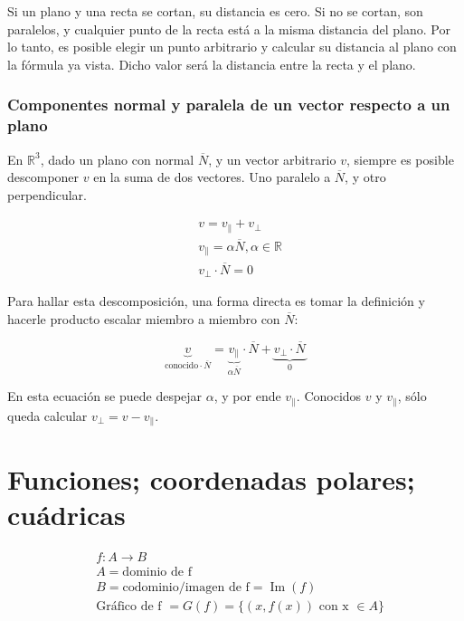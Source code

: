 \documentclass{article}
\renewcommand{\Bbb}{\mathbb}
\begin{document}
Si un plano y una recta se cortan, su distancia es cero. Si no se cortan, son paralelos, y cualquier punto de la recta está a la misma distancia del plano. Por lo tanto, es posible elegir un punto arbitrario y calcular su distancia al plano con la fórmula ya vista. Dicho valor será la distancia entre la recta y el plano.

\subsubsection{Componentes normal y paralela de un vector respecto a un plano}

En $\Bbb R^3$, dado un plano con normal $\overline{N}$, y un vector arbitrario $v$, siempre es posible descomponer $v$ en la suma de dos vectores. Uno paralelo a $\overline{N}$, y otro perpendicular.

\begin{align}
& v = v_{\parallel} + v_{\perp} \\
& v_{\parallel} = \alpha \overline{N}, \alpha \in \Bbb R \\
& v_{\perp} \cdot \overline{N} = 0
\end{align}

Para hallar esta descomposición, una forma directa es tomar la definición y hacerle producto escalar miembro a miembro con $\overline{N}$:

\begin{equation}
\underbrace{v}_{\text{conocido} \cdot \overline{N}} = \underbrace{v_{\parallel}}_{\alpha \overline{N}} \cdot \overline{N} + \underbrace{v_{\perp} \cdot \overline{N}}_{0}
\end{equation}

En esta ecuación se puede despejar $\alpha$, y por ende $v_{\parallel}$. Conocidos $v$ y $v_{\parallel}$, sólo queda calcular $v_{\perp} = v - v_{\parallel}$.

\bigskip

\section{Funciones; coordenadas polares; cuádricas}

\begin{subequations}
\begin{align}
&f: A \rightarrow B \\
&A = \text{dominio de f} \\
&B = \text{codominio/imagen de f} = \mathop{Im}(f) \\
&\text{Gráfico de f } = G(f) = \{ (x, f(x)) \text{ con x } \in A \}
\end{align}
\end{subequations}
\end{document}
